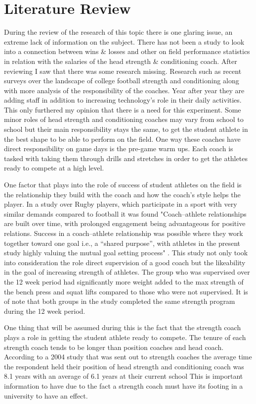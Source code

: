\documentclass[12pt,english]{article}
\begin{document}
\section{Literature Review}\label{sec:litreview}
During the review of the research of this topic there is one glaring issue, an extreme lack of information on the subject. There has not been a study to look into a connection between wins & losses and other on field performance statistics in relation with the salaries of the head strength & conditioning coach. After reviewing I saw that there was some research missing. Research such as recent surveys over the landscape of college football strength and conditioning along with more analysis of the responsibility of the coaches. Year after year they are adding staff in addition to increasing technology's role in their daily activities.  This only furthered my opinion that there is a need for this experiment. Some minor roles of head strength and conditioning coaches may vary from school to school but their main responsibility stays the same, to get the student athlete in the best shape to be able to perform on the field. One way these coaches have direct responsibility on game days is the pre-game warm ups. Each coach is tasked with taking them through drills and stretches in order to get the athletes ready to compete at a high level. 

One factor that plays into the role of success of student athletes on the field is the relationship they build with the coach and how the coach's style helps the player. In a study over Rugby players, which participate in a sport with very similar demands compared to football it was found "Coach–athlete relationships are built over time, with prolonged engagement being advantageous for positive relations. Success in a coach–athlete relationship was possible where they work together toward one goal i.e., a “shared purpose”, with athletes in the present study highly valuing the mutual goal setting process" \cite{article}. This study not only took into consideration the role direct supervision of a good coach but the likeability in the goal of increasing strength of athletes. The group who was supervised over the 12 week period had significantly more weight added to the max strength of the bench press and squat lifts compared to those who were not supervised. It is of note that both groups in the study completed the same strength program during the 12 week period. 

One thing that will be assumed during this is the fact that the strength coach plays a role in getting the student athlete ready to compete. The tenure of each strength coach tends to be longer than position coaches and head coach. According to a 2004 study that was sent out to strength coaches the average time the respondent held their position of head strength and conditioning coach was 8.1 years with an average of 6.1 years at their current school \cite{article} This is important information to have due to the fact a strength coach must have its footing in a university to have an effect. 
\end{document}
